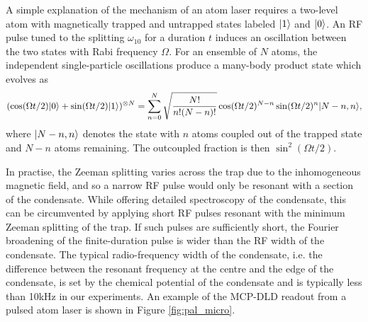 	A simple explanation of the mechanism of an atom laser requires a two-level atom with magnetically trapped and untrapped states labeled $|1\rangle$ and $|0\rangle$. An RF pulse tuned to the splitting $\omega_{10}$ for a duration $t$  induces an oscillation between the two states with Rabi frequency $\Omega$. For an ensemble of $N$ atoms, the independent single-particle oscillations produce a many-body product state which evolves as \cite{mewes97}
	\begin{equation}
		(\cos(\Omega t/2)|0\rangle + \sin(\Omega t/2)|1\rangle)^{\otimes N} = \sum_{n=0}^{ N}\sqrt{\frac{N!}{n!(N-n)!}}\cos(\Omega t/2)^{N-n}\sin(\Omega t/2)^n|N-n,n\rangle,
	\end{equation}
	where $|N-n,n\rangle$ denotes the state with $n$ atoms coupled out of the trapped state and $N-n$ atoms remaining. The outcoupled fraction is then $\sin^2(\Omega t/2)$.

	In practise, the Zeeman splitting varies across the trap due to the inhomogeneous magnetic field, and so a narrow RF pulse would only be resonant with a section of the condensate. While offering detailed spectroscopy of the condensate, this can be circumvented by applying short RF pulses resonant with the minimum Zeeman splitting of the trap. If such pulses are sufficiently short, the Fourier broadening of the finite-duration pulse is wider than the RF width of the condensate. The typical radio-frequency width of the condensate, i.e. the difference between the resonant frequency at the centre and the edge of the condensate, is set by the chemical potential of the condensate and is typically less than 10kHz in our experiments. An example of the MCP-DLD readout from a pulsed atom laser is shown in Figure \ref{fig:pal_micro}. 

